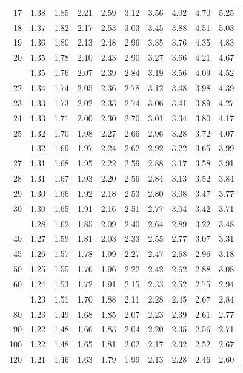 \documentclass[10pt]{article}
\begin{document}
\begin{longtable}{@{}r!{\vrule width 0.8pt\hspace{0.55em}}rrrrrrrrr@{}}
17 & 1.38 & 1.85 & 2.21 & 2.59 & 3.12 & 3.56 & 4.02 & 4.70 & 5.25 \\
18 & 1.37 & 1.82 & 2.17 & 2.53 & 3.03 & 3.45 & 3.88 & 4.51 & 5.03 \\
19 & 1.36 & 1.80 & 2.13 & 2.48 & 2.96 & 3.35 & 3.76 & 4.35 & 4.83 \\
20 & 1.35 & 1.78 & 2.10 & 2.43 & 2.90 & 3.27 & 3.66 & 4.21 & 4.67 \\
 & 1.35 & 1.76 & 2.07 & 2.39 & 2.84 & 3.19 & 3.56 & 4.09 & 4.52 \\
22 & 1.34 & 1.74 & 2.05 & 2.36 & 2.78 & 3.12 & 3.48 & 3.98 & 4.39 \\
23 & 1.33 & 1.73 & 2.02 & 2.33 & 2.74 & 3.06 & 3.41 & 3.89 & 4.27 \\
24 & 1.33 & 1.71 & 2.00 & 2.30 & 2.70 & 3.01 & 3.34 & 3.80 & 4.17 \\
25 & 1.32 & 1.70 & 1.98 & 2.27 & 2.66 & 2.96 & 3.28 & 3.72 & 4.07 \\
 & 1.32 & 1.69 & 1.97 & 2.24 & 2.62 & 2.92 & 3.22 & 3.65 & 3.99 \\
27 & 1.31 & 1.68 & 1.95 & 2.22 & 2.59 & 2.88 & 3.17 & 3.58 & 3.91 \\
28 & 1.31 & 1.67 & 1.93 & 2.20 & 2.56 & 2.84 & 3.13 & 3.52 & 3.84 \\
29 & 1.30 & 1.66 & 1.92 & 2.18 & 2.53 & 2.80 & 3.08 & 3.47 & 3.77 \\
30 & 1.30 & 1.65 & 1.91 & 2.16 & 2.51 & 2.77 & 3.04 & 3.42 & 3.71 \\
 & 1.28 & 1.62 & 1.85 & 2.09 & 2.40 & 2.64 & 2.89 & 3.22 & 3.48 \\
40 & 1.27 & 1.59 & 1.81 & 2.03 & 2.33 & 2.55 & 2.77 & 3.07 & 3.31 \\
45 & 1.26 & 1.57 & 1.78 & 1.99 & 2.27 & 2.47 & 2.68 & 2.96 & 3.18 \\
50 & 1.25 & 1.55 & 1.76 & 1.96 & 2.22 & 2.42 & 2.62 & 2.88 & 3.08 \\
60 & 1.24 & 1.53 & 1.72 & 1.91 & 2.15 & 2.33 & 2.52 & 2.75 & 2.94 \\
 & 1.23 & 1.51 & 1.70 & 1.88 & 2.11 & 2.28 & 2.45 & 2.67 & 2.84 \\
80 & 1.23 & 1.49 & 1.68 & 1.85 & 2.07 & 2.23 & 2.39 & 2.61 & 2.77 \\
90 & 1.22 & 1.48 & 1.66 & 1.83 & 2.04 & 2.20 & 2.35 & 2.56 & 2.71 \\
100 & 1.22 & 1.48 & 1.65 & 1.81 & 2.02 & 2.17 & 2.32 & 2.52 & 2.67 \\
120 & 1.21 & 1.46 & 1.63 & 1.79 & 1.99 & 2.13 & 2.28 & 2.46 & 2.60 \\

\end{longtable}
\end{document}
